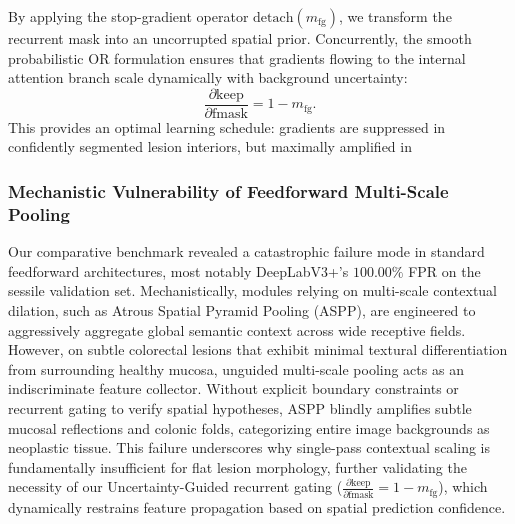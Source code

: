 By applying the stop-gradient operator $\text{detach}(m_{\text{fg}})$,
we transform the recurrent mask into an uncorrupted spatial prior.
Concurrently, the smooth probabilistic OR formulation ensures that
gradients flowing to the internal attention branch scale dynamically
with background uncertainty:
\begin{equation}
  \frac{\partial \text{keep}}{\partial \text{fmask}} = 1 - m_{\text{fg}}.
\end{equation}
This provides an optimal learning schedule: gradients are suppressed in
confidently segmented lesion interiors, but maximally amplified in
\subsubsection{Mechanistic Vulnerability of Feedforward Multi-Scale Pooling}
Our comparative benchmark revealed a catastrophic failure mode in standard
feedforward architectures, most notably DeepLabV3+'s $100.00\%$ FPR on the
sessile validation set. Mechanistically, modules relying on multi-scale
contextual dilation, such as Atrous Spatial Pyramid Pooling (ASPP), are
engineered to aggressively aggregate global semantic context across wide
receptive fields. However, on subtle colorectal lesions that exhibit
minimal textural differentiation from surrounding healthy mucosa, unguided
multi-scale pooling acts as an indiscriminate feature collector. Without
explicit boundary constraints or recurrent gating to verify spatial
hypotheses, ASPP blindly amplifies subtle mucosal reflections and colonic
folds, categorizing entire image backgrounds as neoplastic tissue. This
failure underscores why single-pass contextual scaling is fundamentally
insufficient for flat lesion morphology, further validating the necessity
of our Uncertainty-Guided recurrent gating
($\frac{\partial \text{keep}}{\partial \text{fmask}} = 1 - m_{\text{fg}}$),
which dynamically restrains feature propagation based on spatial prediction
confidence.

